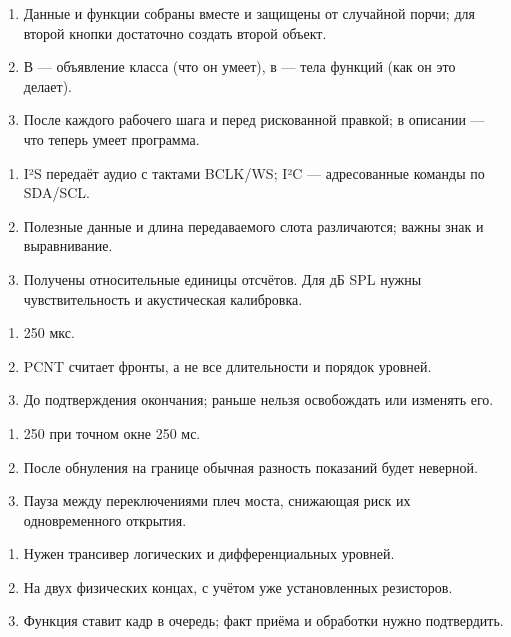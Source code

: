 \begin{enumerate}
  \item Данные и функции собраны вместе и защищены от случайной порчи; для второй кнопки достаточно создать второй объект.
  \item В  --- объявление класса (что он умеет), в  --- тела функций (как он это делает).
  \item После каждого рабочего шага и перед рискованной правкой; в описании --- что теперь умеет программа.
\end{enumerate}

\begin{enumerate}
\item I²S передаёт аудио с тактами BCLK/WS; I²C --- адресованные команды по SDA/SCL.
\item Полезные данные и длина передаваемого слота различаются; важны знак и выравнивание.
\item Получены относительные единицы отсчётов. Для дБ SPL нужны чувствительность и акустическая калибровка.
\end{enumerate}

\begin{enumerate}
\item 250 мкс.
\item PCNT считает фронты, а не все длительности и порядок уровней.
\item До подтверждения окончания; раньше нельзя освобождать или изменять его.
\end{enumerate}

\begin{enumerate}
\item 250 при точном окне 250 мс.
\item После обнуления на границе обычная разность показаний будет неверной.
\item Пауза между переключениями плеч моста, снижающая риск их одновременного открытия.
\end{enumerate}

\begin{enumerate}
\item Нужен трансивер логических и дифференциальных уровней.
\item На двух физических концах, с учётом уже установленных резисторов.
\item Функция ставит кадр в очередь; факт приёма и обработки нужно подтвердить.
\end{enumerate}

